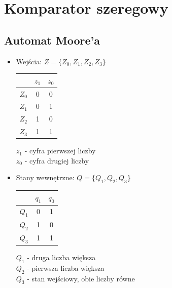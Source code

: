 \documentclass[12pt,a4paper]{article}
\begin{document}
	\section{Komparator szeregowy}
	
		\subsection{Automat Moore'a}
		
		\begin{itemize}
			\item Wejścia: \(Z = \{Z_0, Z_1, Z_2, Z_3\}\)\\
			
			\begin{minipage}{{.5\textwidth}}
				\centering
				\begin{tabular}{r|cc}
					&	\(z_1\)	&	\(z_0\)\\\hline
					\(Z_0\)	&	0	&	0	\\
					\(Z_1\)	&	0	&	1	\\
					\(Z_2\)	&	1	&	0	\\
					\(Z_3\)	&	1	&	1	\\
				\end{tabular}
			\end{minipage}%
			\begin{minipage}{{.5\textwidth}}
				\(z_1\) - cyfra pierwszej liczby\\
				\(z_0\) - cyfra drugiej liczby
			\end{minipage}
			
			\item Stany wewnętrzne: \(Q =\{Q_1, Q_2, Q_3\}\)\\
			
			\begin{minipage}{{.5\textwidth}}
				\centering
				\begin{tabular}{r|cc}
					&	\(q_1\)	&	\(q_0\)\\\hline
					\(Q_1\)	&	0	&	1	\\
					\(Q_2\)	&	1	&	0	\\
					\(Q_3\)	&	1	&	1	\\
				\end{tabular}
			\end{minipage}%
			\begin{minipage}{{.5\textwidth}}	
				\(Q_1\) - druga liczba większa\\
				\(Q_2\) - pierwsza liczba większa\\
				\(Q_3\) - stan wejściowy, obie liczby równe\\
			\end{minipage}
			

\end{itemize}
\end{document}
